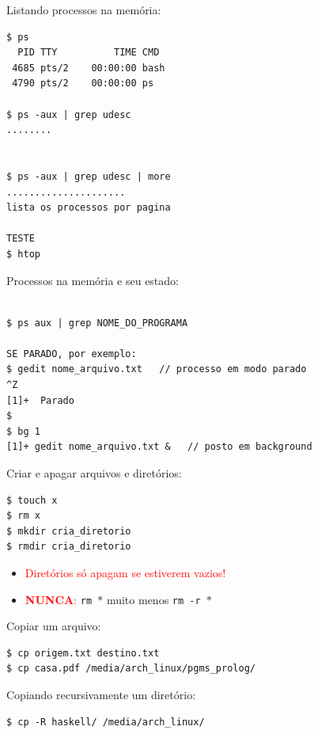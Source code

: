\documentclass[final,a4paper]{article}
\begin{document}
\begin{description}
\pagebreak
\item[\ding{248}] Listando processos na memória:
\begin{verbatim}
$ ps 
  PID TTY          TIME CMD
 4685 pts/2    00:00:00 bash
 4790 pts/2    00:00:00 ps

$ ps -aux | grep udesc
........


$ ps -aux | grep udesc | more
.....................
lista os processos por pagina

TESTE
$ htop

\end{verbatim}



\pagebreak
\item[\ding{248}] Processos na memória e seu estado:
\begin{verbatim}

$ ps aux | grep NOME_DO_PROGRAMA
 
SE PARADO, por exemplo: 
$ gedit nome_arquivo.txt   // processo em modo parado
^Z
[1]+  Parado     
$
$ bg 1
[1]+ gedit nome_arquivo.txt &   // posto em background

\end{verbatim}

\pagebreak
\item[\ding{248}] Criar e apagar arquivos  e diretórios:
\begin{verbatim}
$ touch x
$ rm x
$ mkdir cria_diretorio
$ rmdir cria_diretorio
\end{verbatim}

\begin{itemize}
  \item \textcolor{red}{Diretórios só apagam se estiverem vazios!}
   \item \textcolor{red}{\textbf{NUNCA}:} \texttt{rm $\ast$} muito menos \texttt{rm -r $\ast$}
\end{itemize}

\pagebreak
\item[\ding{248}] Copiar um arquivo:
\begin{verbatim}
$ cp origem.txt destino.txt
$ cp casa.pdf /media/arch_linux/pgms_prolog/

\end{verbatim}

\pagebreak
\item[\ding{248}] Copiando recursivamente um diretório:
\begin{verbatim}
$ cp -R haskell/ /media/arch_linux/

\end{verbatim}


\end{description}
\end{document}
